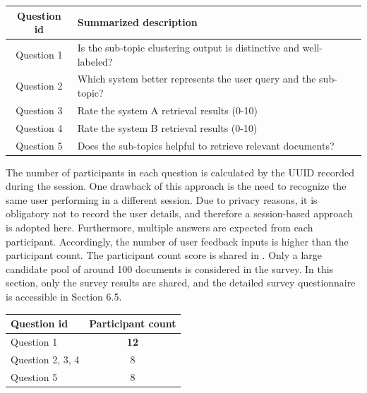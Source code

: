 \begin{center}
	\label{tab:question_summarization}
	\begin{tabularx}{.8\textwidth}{|c|Y|}
		\hline
		Question id  & Summarized description \\
		\hline
		Question 1 & Is the sub-topic clustering output is distinctive and well-labeled?  \\
		\hline
		Question 2 & Which system better represents the user query and the sub-topic? \\
		\hline
		Question 3 & Rate the system A retrieval results (0-10) \\
		\hline
		Question 4 & Rate the system B retrieval results (0-10) \\
		\hline
		Question 5 &  Does the sub-topics helpful to retrieve relevant documents?\\
		\hline
	\end{tabularx}
\end{center}

The number of participants in each question is calculated by the \ac{UUID} recorded during the session. One drawback of this approach is the need to recognize the same user performing in a different session. Due to privacy reasons, it is obligatory not to record the user details, and therefore a session-based approach is adopted here. Furthermore, multiple answers are expected from each participant. Accordingly, the number of user feedback inputs is higher than the participant count. The participant count score is shared in . Only a large candidate pool of around 100 documents is considered in the survey. In this section, only the survey results are shared, and the detailed survey questionnaire is accessible in Section 6.5.

\begin{center}
	\label{tab:participant_cnts}
	\begin{tabularx}{.6\textwidth}{|Y|c|}
		\hline
		Question id & Participant count \\
		\hline
		Question 1 & \textbf{12} \\
		\hline
		Question 2, 3, 4 & 8 \\
		\hline
		Question 5 & 8 \\
		\hline
	\end{tabularx}
\end{center}

